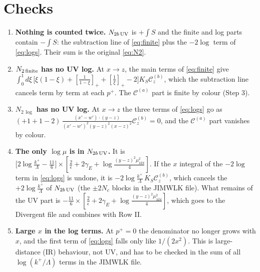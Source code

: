 \documentclass[10pt]{article}
\numberwithin{equation}{section}
\newcommand{\Cz}{\mathcal{C}^{(b)}_{z}}
\newcommand{\UVb}{\left[\frac{2}{\epsilon}+2\gamma_{E}+\log\frac{(y-z)^{2}\mu^{2}_{\overline{MS}}}{4}\right]}
\begin{document}
\section{Checks}
\begin{enumerate}
\item \textbf{Nothing is counted twice.} $N_{2b\,\rm UV}$ is $+\int S$ and the finite and log parts contain $-\int S$: the subtraction line of \eqref{eq:finite} plus the $-2\log$ term of \eqref{eq:logs}. Their sum is the original \eqref{eq:N2}.
\item \textbf{$N_{2\,\rm finite}$ has no UV log.} At $x\to z$, the main terms of \eqref{eq:finite} give $\int_{0}^{1}d\xi\,\big[\xi(1-\xi)+[\tfrac{1}{1-\xi}]_{+}+[\tfrac{1}{\xi}]_{+}-2\big]K_{S}\Cz$, which the subtraction line cancels term by term at each $p^{+}$. The $\mathcal{C}^{(a)}$ part is finite by colour (Step 3).
\item \textbf{$N_{2\,\log}$ has no UV log.} At $x\to z$ the three terms of \eqref{eq:logs} go as $(+1+1-2)\,\frac{(x'-w')\cdot(y-z)}{(x'-w')^{2}(y-z)^{2}(x-z)^{2}}\Cz=0$, and the $\mathcal{C}^{(a)}$ part vanishes by colour.
\item \textbf{The only $\log\mu$ is in $N_{2b\,\rm UV}$.} It is $\big[2\log\frac{k^{+}}{\Lambda}-\frac{11}{6}\big]\times\UVb$. If the $x$ integral of the $-2\log$ term in \eqref{eq:logs} is undone, it is $-2\log\frac{k^{+}}{\Lambda}\,K_{S}\Cz$, which cancels the $+2\log\frac{k^{+}}{\Lambda}$ of $N_{2b\,\rm UV}$ (the $\pm2N_{c}$ blocks in the JIMWLK file). What remains of the UV part is $-\frac{11}{6}\times\UVb$, which goes to the Divergent file and combines with Row II.
\item \textbf{Large $x$ in the log terms.} At $p^{+}=0$ the denominator no longer grows with $x$, and the first term of \eqref{eq:logs} falls only like $1/(2x^{2})$. This is large-distance (IR) behaviour, not UV, and has to be checked in the sum of all $\log(k^{+}/\Lambda)$ terms in the JIMWLK file.
\end{enumerate}
\end{document}
